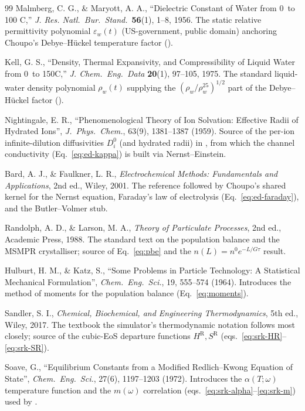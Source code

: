\documentclass[11pt,a4paper]{article}
\begin{document}
\begin{thebibliography}{99}
 Malmberg, C. G., \& Maryott, A. A.,
``Dielectric Constant of Water from 0\textdegree\ to 100\textdegree
C,'' \emph{J. Res. Natl.\ Bur.\ Stand.}\ \textbf{56}(1), 1--8, 1956.
The static relative permittivity polynomial $\varepsilon_w(t)$
(US-government, public domain) anchoring Choupo's Debye--H\"uckel
temperature factor ().

 Kell, G. S., ``Density, Thermal Expansivity, and
Compressibility of Liquid Water from 0\textdegree\ to 150\textdegree C,''
\emph{J. Chem.\ Eng.\ Data} \textbf{20}(1), 97--105, 1975.  The standard
liquid-water density polynomial $\rho_w(t)$ supplying the
$(\rho_w/\rho_w^{25})^{1/2}$ part of the Debye--H\"uckel factor
().

 Nightingale, E. R., ``Phenomenological Theory
of Ion Solvation: Effective Radii of Hydrated Ions'', \emph{J.\ Phys.\
Chem.}, 63(9), 1381--1387 (1959). Source of the per-ion
infinite-dilution diffusivities $D_i^0$ (and hydrated radii) in
, from which the channel conductivity
(Eq.~\ref{eq:ed-kappa}) is built via Nernst--Einstein.

 Bard, A. J., \& Faulkner, L. R.,
\emph{Electrochemical Methods: Fundamentals and Applications}, 2nd ed.,
Wiley, 2001. The reference followed by Choupo's shared 
kernel for the Nernst equation, Faraday's law of electrolysis
(Eq.~\ref{eq:ed-faraday}), and the Butler--Volmer stub.

 Randolph, A. D., \& Larson, M. A.,
\emph{Theory of Particulate Processes}, 2nd ed., Academic Press, 1988.
The standard text on the population balance and the MSMPR crystalliser;
source of Eq.~\ref{eq:pbe} and the $n(L)=n^0 e^{-L/G\tau}$ result.

 Hulburt, H. M., \& Katz, S., ``Some Problems in
Particle Technology: A Statistical Mechanical Formulation'',
\emph{Chem.\ Eng.\ Sci.}, 19, 555--574 (1964). Introduces the method
of moments for the population balance (Eq.~\ref{eq:moments}).

 Sandler, S. I.,
\emph{Chemical, Biochemical, and Engineering Thermodynamics}, 5th ed.,
Wiley, 2017. The textbook the simulator's thermodynamic notation
follows most closely; source of the cubic-EoS departure functions
$H^{\mathrm R}, S^{\mathrm R}$ (eqs.~\ref{eq:srk-HR}--\ref{eq:srk-SR}).

 Soave, G., ``Equilibrium Constants from a Modified
Redlich--Kwong Equation of State'', \emph{Chem.\ Eng.\ Sci.}, 27(6),
1197--1203 (1972). Introduces the $\alpha(T;\omega)$ temperature
function and the $m(\omega)$ correlation
(eqs.~\ref{eq:srk-alpha}--\ref{eq:srk-m}) used by .


\end{thebibliography}
\end{document}
